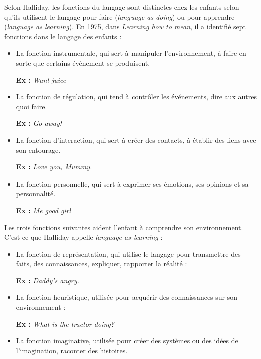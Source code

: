 Selon Halliday, les fonctions du langage sont distinctes chez les enfants selon qu’ils utilisent le langage pour faire (\textit{language as doing}) ou pour apprendre (\textit{language as learning}). En 1975, dans \textit{Learning how to mean}, il a identifié sept fonctions dans le langage des enfants :
\begin{itemize}
\item La fonction instrumentale, qui sert à manipuler l’environnement, à faire en sorte que certains événement se produisent.\par
\textbf{Ex :} \textit{Want juice}
\item La fonction de régulation, qui tend à contrôler les événements, dire aux autres quoi faire.\par
\textbf{Ex :} \textit{Go away!}
\item La fonction d’interaction, qui sert à créer des contacts, à établir des liens avec son entourage.\par
\textbf{Ex :} \textit{Love you, Mummy.}
\item La fonction personnelle, qui sert à exprimer ses émotions, ses opinions et sa personnalité.\par
\textbf{Ex :} \textit{Me good girl}
\end{itemize}
Les trois fonctions suivantes aident l’enfant à comprendre son environnement. C’est ce que Halliday appelle \textit{language as learning} :
\begin{itemize}
\item La fonction de représentation, qui utilise le langage pour transmettre des faits, des connaissances, expliquer, rapporter la réalité :\par
\textbf{Ex :} \textit{Daddy’s angry.}
\item La fonction heuristique, utilisée pour acquérir des connaissances sur son environnement :\par
\textbf{Ex :} \textit{What is the tractor doing?}
\item La fonction imaginative, utilisée pour créer des systèmes ou des idées de l’imagination, raconter des histoires.
\end{itemize}

